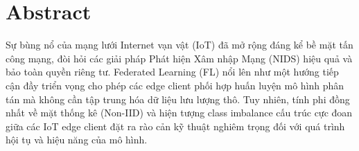 \chapter*{Abstract}

Sự bùng nổ của mạng lưới Internet vạn vật (IoT) đã mở rộng đáng kể bề mặt tấn công mạng, đòi hỏi các giải pháp Phát hiện Xâm nhập Mạng (NIDS) hiệu quả và bảo toàn quyền riêng tư. Federated Learning (FL) nổi lên như một hướng tiếp cận đầy triển vọng cho phép các edge client phối hợp huấn luyện mô hình phân tán mà không cần tập trung hóa dữ liệu lưu lượng thô. Tuy nhiên, tính phi đồng nhất về mặt thống kê (Non-IID) và hiện tượng class imbalance cấu trúc cực đoan giữa các IoT edge client đặt ra rào cản kỹ thuật nghiêm trọng đối với quá trình hội tụ và hiệu năng của mô hình.

